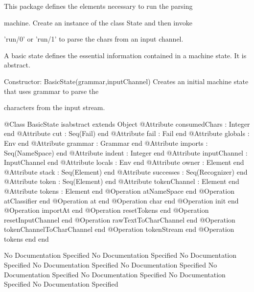       This package defines the elements necessary to run the parsing

      machine. Create an instance of the class State and then invoke

      'run/0' or 'run/1' to parse the chars from an input channel.

      A basic state defines the essential information contained in a 
      machine state. It is abstract.
      
      Constructor: BasicState(grammar,inputChannel)
        Creates an initial machine state that uses grammar to parse the

        characters from the input stream.
\begin{Interface}
@Class BasicState isabstract extends Object
  @Attribute consumedChars : Integer end
  @Attribute cut : Seq(Fail) end
  @Attribute fail : Fail end
  @Attribute globals : Env end
  @Attribute grammar : Grammar end
  @Attribute imports : Seq(NameSpace) end
  @Attribute indent : Integer end
  @Attribute inputChannel : InputChannel end
  @Attribute locals : Env end
  @Attribute owner : Element end
  @Attribute stack : Seq(Element) end
  @Attribute successes : Seq(Recognizer) end
  @Attribute token : Seq(Element) end
  @Attribute tokenChannel : Element end
  @Attribute tokens : Element end
  @Operation atNameSpace end
  @Operation atClassifier end
  @Operation at end
  @Operation char end
  @Operation init end
  @Operation importAt end
  @Operation resetTokens end
  @Operation resetInputChannel end
  @Operation rawTextToCharChannel end
  @Operation tokenChannelToCharChannel end
  @Operation tokenStream end
  @Operation tokens end
end
\end{Interface}
No Documentation Specified
No Documentation Specified
No Documentation Specified
No Documentation Specified
No Documentation Specified
No Documentation Specified
No Documentation Specified
No Documentation Specified
No Documentation Specified
